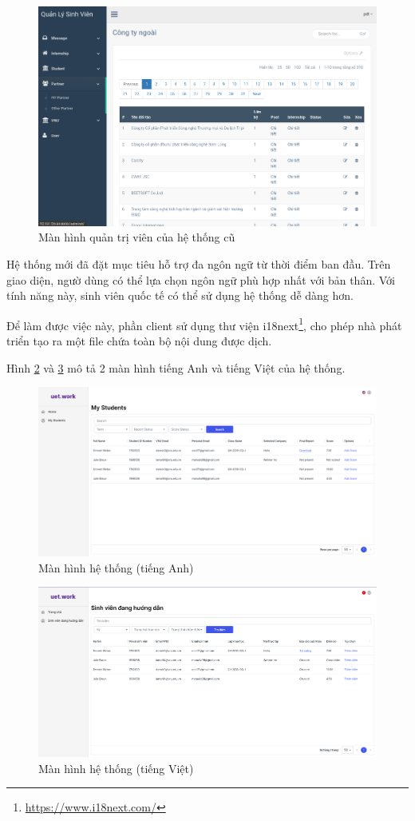 \documentclass[./../main.tex]{subfiles}
\begin{document}
\begin{figure}[]
	\includegraphics[width=\linewidth]{./images/old_admin_page.png}
	\caption{Màn hình quản trị viên của hệ thống cũ}
	\label{fig:old_admin_page}
\end{figure}

Hệ thống mới đã đặt mục tiêu hỗ trợ đa ngôn ngữ từ thời điểm ban đầu. Trên giao diện, ngườ dùng có thể lựa chọn ngôn ngữ phù hợp nhất với bản thân. Với tính năng này, sinh viên quốc tế có thể sử dụng hệ thống dễ dàng hơn.

Để làm được việc này, phần client sử dụng thư viện i18next\footnote{\url{https://www.i18next.com/}}, cho phép nhà phát triển tạo ra một file chứa toàn bộ nội dung được dịch.

Hình \ref{fig:en_page} và \ref{fig:vi_page} mô tả 2 màn hình tiếng Anh và tiếng Việt của hệ thống.

\begin{figure}[]
	\includegraphics[width=\linewidth]{./images/image13.png}
	\caption{Màn hình hệ thống (tiếng Anh)}
	\label{fig:en_page}
\end{figure}

\begin{figure}[]
	\includegraphics[width=\linewidth]{./images/image12.png}
	\caption{Màn hình hệ thống (tiếng Việt)}
	\label{fig:vi_page}
\end{figure}
\end{document}
